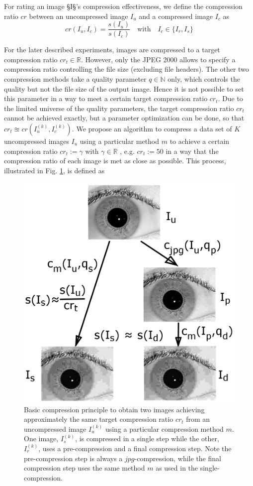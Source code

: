 \documentclass[10pt,twocolumn,letterpaper]{article}
\begin{document}
For rating an image §I§'s compression effectiveness, we define the compression ratio $cr$ between an uncompressed image $I_u$ and a compressed image $I_c$ as 
\begin{equation}
cr(I_u, I_c) = \frac{s(I_u)}{s(I_c)} \quad \text{with} \quad I_c \in \{I_r, I_s\}
\end{equation}

For the later described experiments, images are compressed to a target compression ratio $cr_t \in \mathbb{R}$. However, only the JPEG 2000 \cite{j2k} allows to specify a compression ratio controlling the file size (excluding file headers). The other two compression methods take a quality parameter $q \in \mathbb{N}$ only, which controls the quality but not the file size of the output image. Hence it is not possible to set this parameter in a way to meet a certain target compression ratio $cr_t$. Due to the limited universe of the quality parameters, the target compression ratio $cr_t$ cannot be achieved exactly, but a parameter optimization can be done, so that $cr_t \approxeq cr(I_u^{(k)}, I_c^{(k)})$. We propose an algorithm to compress a data set of $K$ uncompressed images $I_u$ using a particular method $m$ to achieve a certain compression ratio $cr_t := \gamma$ with $\gamma \in \mathbb{R}$ , e.g. $cr_t := 50$ in a way that the compression ratio of each image is met as close as possible. This process, illustrated in Fig. \ref{fig:comprScheme}, is defined as

\begin{figure}[h]
	\begin{center}
		
	\includegraphics[width=0.7\linewidth]{img/comprScheme}
\end{center}
	\caption{Basic compression principle to obtain two images achieving approximately the same target compression ratio $cr_t$ from an uncompressed image $I_u^{(k)}$ using a particular compression method $m$. One image, $I_s^{(k)}$, is compressed in a single step while the other, $I_r^{(k)}$, uses a pre-compression and a final compression step. Note the pre-compression step is always a $jpg$-compression, while the final compression step uses the same method $m$ as used in the single-compression.}
	\label{fig:comprScheme}
	
\end{figure}
\end{document}
